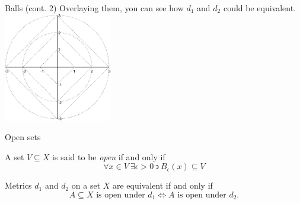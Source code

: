 \documentclass{beamer}
\begin{document}
\begin{frame}{Balls (cont. 2)}
    Overlaying them, you can see how $d_1$ and $d_2$ could be equivalent.\\
    \centering
    \includegraphics[height=180]{nest.pdf} \\
\end{frame}

\begin{frame}{Open sets}
    \begin{definition}{}
        A set $V \subseteq X$ is said to be \emph{open} if and only if
        \[
            \forall x \in V \ \exists \epsilon > 0 \ \backepsilon \ B_\epsilon(x) \subseteq V
        \]
    \end{definition}

    \pause{}

    \begin{theorem}{}
        Metrics $d_1$ and $d_2$ on a set $X$ are equivalent if and only if
        \[
            A \subseteq X \text{ is open under } d_1 \iff A \text{ is open under } d_2.
        \]
    \end{theorem}

\end{frame}
\end{document}
